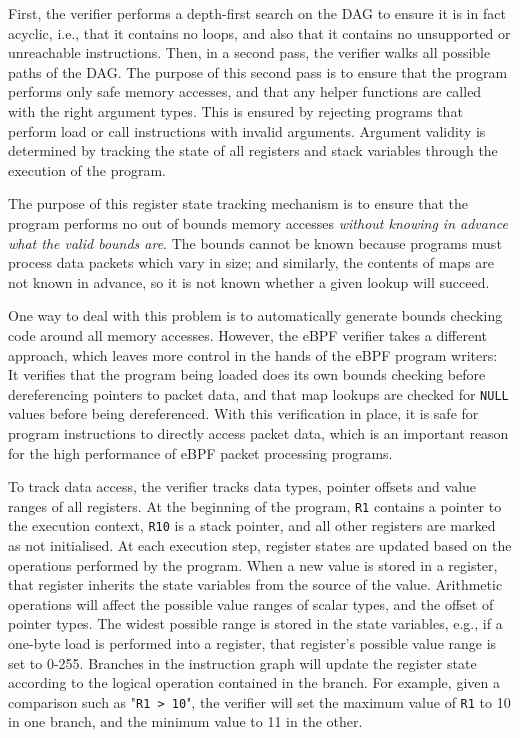 \documentclass[sigconf]{acmart}
\begin{document}
First, the verifier performs a depth-first search on the DAG to ensure it is in
fact acyclic, i.e., that it contains no loops, and also that it contains no
unsupported or unreachable instructions. Then, in a second pass, the verifier
walks all possible paths of the DAG. The purpose of this second pass is to
ensure that the program performs only safe memory accesses, and that any helper
functions are called with the right argument types. This is ensured by rejecting
programs that perform load or call instructions with invalid arguments. Argument
validity is determined by tracking the state of all registers and stack
variables through the execution of the program.

The purpose of this register state tracking mechanism is to ensure that the
program performs no out of bounds memory accesses \emph{without knowing in
  advance what the valid bounds are}. The bounds cannot be known because
programs must process data packets which vary in size; and similarly, the
contents of maps are not known in advance, so it is not known whether a given
lookup will succeed.

One way to deal with this problem is to automatically generate bounds checking
code around all memory accesses. However, the eBPF verifier takes a different
approach, which leaves more control in the hands of the eBPF program writers: It
verifies that the program being loaded does its own bounds checking before
dereferencing pointers to packet data, and that map lookups are checked for
\texttt{NULL} values before being dereferenced. With this verification in place,
it is safe for program instructions to directly access packet data, which is an
important reason for the high performance of eBPF packet processing programs.

To track data access, the verifier tracks data types, pointer offsets and value
ranges of all registers. At the beginning of the program, \texttt{R1} contains a
pointer to the execution context, \texttt{R10} is a stack pointer, and all other
registers are marked as not initialised. At each execution step, register states
are updated based on the operations performed by the program. When a new value
is stored in a register, that register inherits the state variables from the
source of the value. Arithmetic operations will affect the possible value ranges
of scalar types, and the offset of pointer types. The widest possible range is
stored in the state variables, e.g., if a one-byte load is performed into a
register, that register's possible value range is set to 0-255. Branches in the
instruction graph will update the register state according to the logical
operation contained in the branch. For example, given a comparison such as
"\texttt{R1 > 10}", the verifier will set the maximum value of \texttt{R1} to 10
in one branch, and the minimum value to 11 in the other.
\end{document}
